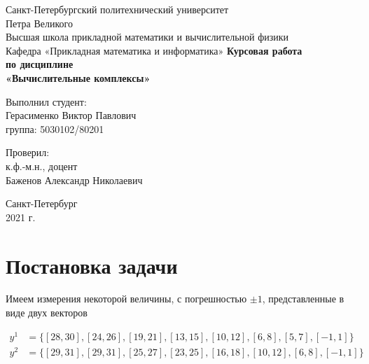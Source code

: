\documentclass[12pt,a4paper]{article}
\begin{document}
    \begin{titlepage}
    		\begin{center}		
    			\vfill	
    			Санкт-Петербургский политехнический университет \\
    			Петра Великого\\
    			\vskip 1cm
    			Высшая школа прикладной математики и вычислительной физики \\
    			Кафедра «Прикладная математика и информатика»
    			\vfill
    			\textbf{Курсовая работа\\
    				по дисциплине\\
    				«Вычислительные комплексы»\\}
    			\vfill
    		\end{center}
    		\vfill
    		\hfill
    		\begin{minipage}{0.4\textwidth}
    			Выполнил студент:\\
    			Герасименко Виктор Павлович\\
    			группа: 5030102/80201\\
    		\end{minipage}
    		\vfill
    		\hfill 
    		\begin{minipage}{0.4\textwidth}
    			Проверил:\\
    			к.ф.-м.н., доцент\\
    			Баженов Александр Николаевич\
    		\end{minipage}
    		\vfill
    		\hfill 
    		\begin{center}
    			Санкт-Петербург\\2021 г.
    		\end{center}
    	\end{titlepage}
    	
    	\tableofcontents
    	\listoffigures
    	\pagebreak
    	
    	
    \section{Постановка задачи}
        Имеем измерения некоторой величины, с погрешностью $\pm1$, представленные в виде двух векторов
        
        \begin{align}
        y^{1} &= \{  [28, 30],  [24, 26],   [19, 21],   [13, 15],   [10, 12],   [6, 8],   [5, 7],    [-1, 1]\} \\
        y^{2} &= \{  [29, 31],  [29, 31],   [25, 27],   [23, 25],   [16, 18],   [10, 12],   [6, 8],     [-1, 1]\}
        \end{align}
        
\end{document}

